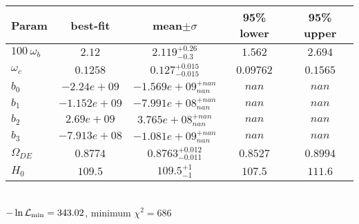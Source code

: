 \begin{tabular}{|l|c|c|c|c|} 
 \hline 
Param & best-fit & mean$\pm\sigma$ & 95\% lower & 95\% upper \\ \hline 
$100~\omega_{b }$ &$2.12$ & $2.119_{-0.3}^{+0.26}$ & $1.562$ & $2.694$ \\ 
$\omega_c$ &$0.1258$ & $0.127_{-0.015}^{+0.015}$ & $0.09762$ & $0.1565$ \\ 
$b_{0 }$ &$-2.24e+09$ & $-1.569e+09_{nan}^{+nan}$ & $nan$ & $nan$ \\ 
$b_{1 }$ &$-1.152e+09$ & $-7.991e+08_{nan}^{+nan}$ & $nan$ & $nan$ \\ 
$b_{2 }$ &$2.69e+09$ & $3.765e+08_{nan}^{+nan}$ & $nan$ & $nan$ \\ 
$b_{3 }$ &$-7.913e+08$ & $-1.081e+09_{nan}^{+nan}$ & $nan$ & $nan$ \\ 
$\Omega_{DE}$ &$0.8774$ & $0.8763_{-0.011}^{+0.012}$ & $0.8527$ & $0.8994$ \\ 
$H_{0 }$ &$109.5$ & $109.5_{-1}^{+1}$ & $107.5$ & $111.6$ \\ 
\hline 
 \end{tabular} \\ 
$-\ln{\cal L}_\mathrm{min} =343.02$, minimum $\chi^2=686$ \\ 
